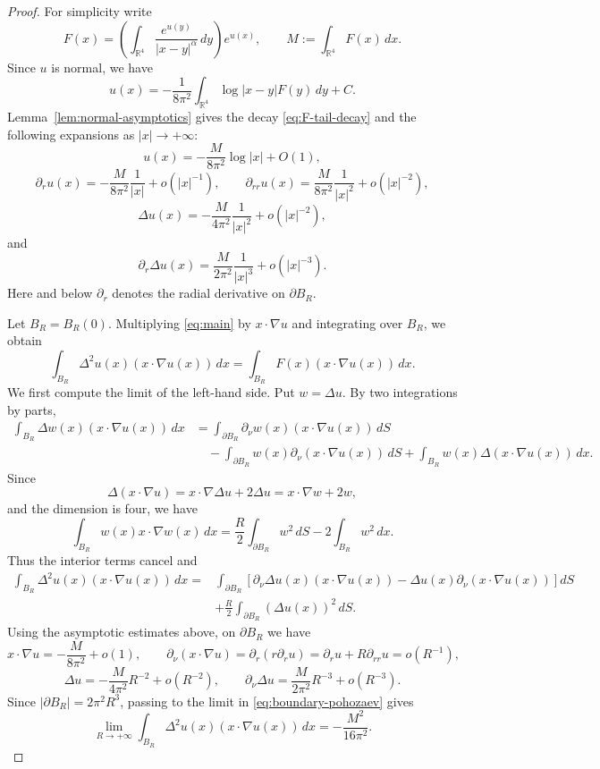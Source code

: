 \documentclass[11pt]{article}
\numberwithin{equation}{section}
\begin{document}
\begin{proof}
For simplicity write
\[
F(x)=
\left(\int_{\mathbb R^{4}}\frac{e^{u(y)}}{|x-y|^{\alpha}}\,dy\right)e^{u(x)},
\qquad
M:=\int_{\mathbb R^{4}}F(x)\,dx.
\]
Since \(u\) is normal, we have
\[
u(x)=
-\frac{1}{8\pi^{2}}
\int_{\mathbb R^{4}}\log|x-y|F(y)\,dy+C.
\]
Lemma~\ref{lem:normal-asymptotics} gives the decay \eqref{eq:F-tail-decay} and the following expansions as \(|x|\to+\infty\):
\[
u(x)=-\frac{M}{8\pi^{2}}\log|x|+O(1),
\]
\[
\partial_{r}u(x)=-\frac{M}{8\pi^{2}}\frac{1}{|x|}+o(|x|^{-1}),
\qquad
\partial_{rr}u(x)=\frac{M}{8\pi^{2}}\frac{1}{|x|^{2}}+o(|x|^{-2}),
\]
\[
\Delta u(x)=-\frac{M}{4\pi^{2}}\frac{1}{|x|^{2}}+o(|x|^{-2}),
\]
and
\[
\partial_{r}\Delta u(x)=
\frac{M}{2\pi^{2}}\frac{1}{|x|^{3}}+o(|x|^{-3}).
\]
Here and below \(\partial_{r}\) denotes the radial derivative on \(\partial B_{R}\).

Let \(B_{R}=B_{R}(0)\). Multiplying \eqref{eq:main} by \(x\cdot\nabla u\) and integrating over \(B_{R}\), we obtain
\begin{equation}\label{eq:pohozaev-start}
\int_{B_{R}}\Delta^{2}u(x)(x\cdot\nabla u(x))\,dx
=
\int_{B_{R}}F(x)(x\cdot\nabla u(x))\,dx.
\end{equation}
We first compute the limit of the left-hand side. Put \(w=\Delta u\). By two integrations by parts,
\[
\begin{aligned}
\int_{B_{R}}\Delta w(x)(x\cdot\nabla u(x))\,dx
&=
\int_{\partial B_{R}}\partial_{\nu}w(x)(x\cdot\nabla u(x))\,dS  \\
&\quad
-
\int_{\partial B_{R}}w(x)\partial_{\nu}(x\cdot\nabla u(x))\,dS
+
\int_{B_{R}}w(x)\Delta(x\cdot\nabla u(x))\,dx.
\end{aligned}
\]
Since
\[
\Delta(x\cdot\nabla u)=x\cdot\nabla\Delta u+2\Delta u=x\cdot\nabla w+2w,
\]
and the dimension is four, we have
\[
\int_{B_{R}}w(x)x\cdot\nabla w(x)\,dx
=
\frac{R}{2}\int_{\partial B_{R}}w^{2}\,dS
-2\int_{B_{R}}w^{2}\,dx.
\]
Thus the interior terms cancel and
\begin{equation}\label{eq:boundary-pohozaev}
\begin{aligned}
\int_{B_{R}}\Delta^{2}u(x)(x\cdot\nabla u(x))\,dx
={}&
\int_{\partial B_{R}}
\left[
\partial_{\nu}\Delta u(x)(x\cdot\nabla u(x))
-
\Delta u(x)\partial_{\nu}(x\cdot\nabla u(x))
\right]dS\\
&+
\frac{R}{2}\int_{\partial B_{R}}(\Delta u(x))^{2}\,dS.
\end{aligned}
\end{equation}
Using the asymptotic estimates above, on \(\partial B_{R}\) we have
\[
x\cdot\nabla u=-\frac{M}{8\pi^{2}}+o(1),
\qquad
\partial_{\nu}(x\cdot\nabla u)
=\partial_{r}(r\partial_{r}u)
=\partial_{r}u+R\partial_{rr}u=o(R^{-1}),
\]
\[
\Delta u=-\frac{M}{4\pi^{2}}R^{-2}+o(R^{-2}),
\qquad
\partial_{\nu}\Delta u=\frac{M}{2\pi^{2}}R^{-3}+o(R^{-3}).
\]
Since \(|\partial B_{R}|=2\pi^{2}R^{3}\), passing to the limit in \eqref{eq:boundary-pohozaev} gives
\begin{equation}\label{eq:left-pohozaev-limit}
\lim_{R\to+\infty}
\int_{B_{R}}\Delta^{2}u(x)(x\cdot\nabla u(x))\,dx
=
-\frac{M^{2}}{16\pi^{2}}.
\end{equation}


\end{proof}
\end{document}
